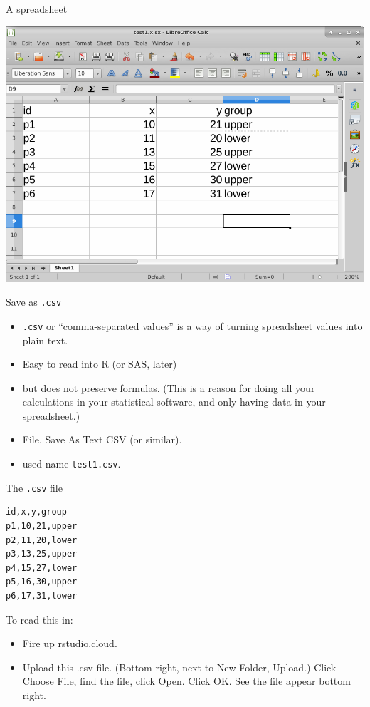 \documentclass[
  ignorenonframetext,
]{beamer}
\providecommand{\tightlist}{%
  \setlength{\itemsep}{0pt}\setlength{\parskip}{0pt}}
\begin{document}
\begin{frame}{A spreadsheet}
\protect\hypertarget{a-spreadsheet}{}

\includegraphics{spreadsheet.png}

\end{frame}

\begin{frame}[fragile]{Save as \texttt{.csv}}
\protect\hypertarget{save-as-.csv}{}

\begin{itemize}
\tightlist
\item
  \texttt{.csv} or ``comma-separated values'' is a way of turning
  spreadsheet values into plain text.
\item
  Easy to read into R (or SAS, later)
\item
  but does not preserve formulas. (This is a reason for doing all your
  calculations in your statistical software, and only having data in
  your spreadsheet.)
\item
  File, Save As Text CSV (or similar).
\item
  used name \texttt{test1.csv}.
\end{itemize}

\end{frame}

\begin{frame}[fragile]{The \texttt{.csv} file}
\protect\hypertarget{the-.csv-file}{}

\begin{verbatim}
id,x,y,group
p1,10,21,upper
p2,11,20,lower
p3,13,25,upper
p4,15,27,lower
p5,16,30,upper
p6,17,31,lower
\end{verbatim}

To read this in:

\begin{itemize}
\tightlist
\item
  Fire up rstudio.cloud.
\item
  Upload this .csv file. (Bottom right, next to New Folder, Upload.)
  Click Choose File, find the file, click Open. Click OK. See the file
  appear bottom right.
\end{itemize}

\end{frame}
\end{document}

